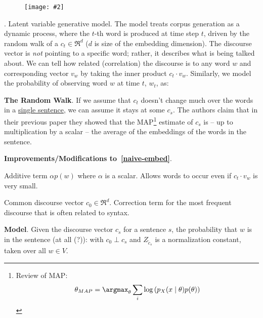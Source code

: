 \documentclass[11pt]{article}
\newcommand\myfig[2][0.3\textwidth]{\begin{figure}[h!]\centering\texttt{[image: \#2]}\end{figure}}
\newcommand\myspace[1][]{\vspace{#1\bigskipamount}}
\newcommand\p{\Needspace{10\baselineskip} \noindent}
\begin{document}
\myfig[0.8\textwidth]{AroraEmbeddingAlg.png}

\myspace
\p {}. Latent variable generative model. The model treats corpus generation as a dynamic process, where the $t$-th word is produced at time step $t$, driven by the random walk of a  $c_t \in \Re^d$ ($d$ is size of the embedding dimension). The discourse vector is \textit{not} pointing to a specific word; rather, it describes what is being talked about. We can tell how related (correlation) the discourse is to any word $w$ and corresponding vector $v_w$ by taking the inner product $c_t \cdot v_w$. Similarly, we model the probability of observing word $w$ at time $t$, $w_t$, as:
\begin{compactitem}
	\item \textbf{The Random Walk}. If we assume that $c_t$ doesn't change much over the words in a \underline{single sentence}, we can assume it stays at some $c_s$. The authors claim that in their previous paper they showed that the MAP\footnote{Review of MAP: $$ \theta_{MAP} = \argmax_\theta \sum_i \log\left(p_X(x \mid \theta) p(\theta) \right)$$ } estimate of $c_s$ is -- up to multiplication by a scalar -- the average of the embeddings of the words in the sentence.
	
	\item \textbf{Improvements/Modifications to~\ref{naive-embed}}. 
	\begin{compactenum}
		\item Additive term $\alpha p(w)$ where $\alpha$ is a scalar. Allows words to occur even if $c_t \cdot v_w$ is very small.
		\item Common discourse vector $c_0 \in \Re^d$. Correction term for the most frequent discourse that is often related to syntax.
	\end{compactenum}
	
	\item \textbf{Model}. Given the discourse vector $c_s$ for a sentence $s$, the probability that $w$ is in the sentence (at all (?)):
	with $c_0 \perp c_s$ and $Z_{\tilde c_s}$ is a normalization constant, taken over all $w \in V$. 
	
\end{compactitem}
\end{document}

